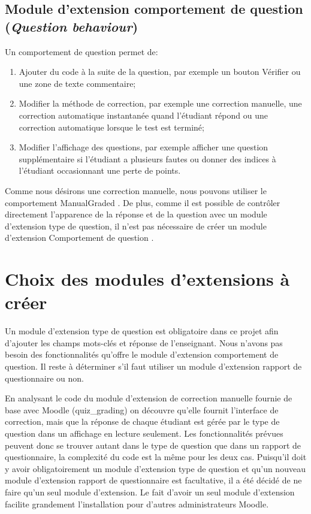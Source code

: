 \subsection{Module d'extension comportement de question (\textit{Question behaviour})}

Un comportement de question permet de:
\begin{enumerate}
  \item Ajouter du code à la suite de la question, par exemple un bouton \og Vérifier \fg{} ou une zone de texte commentaire;
  
  \item Modifier la méthode de correction, par exemple une correction manuelle, une correction automatique instantanée quand l'étudiant répond ou une correction automatique lorsque le test est terminé;
  
  \item Modifier l'affichage des questions, par exemple afficher une question supplémentaire si l'étudiant a plusieurs fautes ou donner des indices à l'étudiant occasionnant une perte de points.
\end{enumerate}

Comme nous désirons une correction manuelle, nous pouvons utiliser le comportement \og ManualGraded \fg{}.
De plus, comme il est possible de contrôler directement l'apparence de la réponse et de la question avec un module d'extension type de question, il n'est pas nécessaire de créer un module d'extension \og Comportement de question \fg{}.

\section{Choix des modules d'extensions à créer}

Un module d'extension type de question est obligatoire dans ce projet afin d'ajouter les champs mots-clés et réponse de l'enseignant.
Nous n'avons pas besoin des fonctionnalités qu'offre le module d'extension comportement de question.
Il reste à déterminer s'il faut utiliser un module d'extension rapport de questionnaire ou non.

En analysant le code du module d'extension de correction manuelle fournie de base avec Moodle (quiz\_grading) on découvre qu'elle fournit l'interface de correction, mais que la réponse de chaque étudiant est gérée par le type de question dans un affichage en lecture seulement.
Les fonctionnalités prévues peuvent donc se trouver autant dans le type de question que dans un rapport de questionnaire, la complexité du code est la même pour les deux cas.
Puisqu'il doit y avoir obligatoirement un module d'extension type de question et qu'un nouveau module d'extension rapport de questionnaire est facultative, il a été décidé de ne faire qu'un seul module d'extension.
Le fait d'avoir un seul module d'extension facilite grandement l'installation pour d'autres administrateurs Moodle.